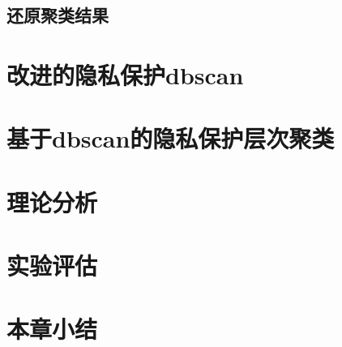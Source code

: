 \subsection{还原聚类结果}
\section{改进的隐私保护dbscan}
\label{s4-t2}
\section{基于dbscan的隐私保护层次聚类}
\label{s4-t3}
\section{理论分析}
\label{s4-lilun}
\section{实验评估}
\label{s4-shiyan}
\section{本章小结}
\label{s4-xiaojie}